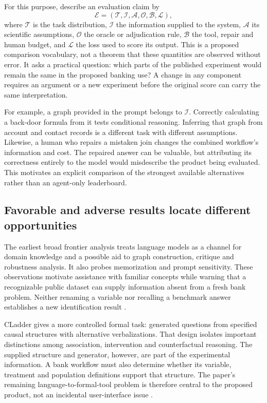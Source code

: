 For this purpose, describe an evaluation claim by
\begin{equation}
 \mathcal E=(\mathcal T,\mathcal I,\mathcal A,\mathcal O,\mathcal B,\mathcal L),
 \label{exec13:frontier-claim}
\end{equation}
where $\mathcal T$ is the task distribution, $\mathcal I$ the information
supplied to the system, $\mathcal A$ its scientific assumptions, $\mathcal O$
the oracle or adjudication rule, $\mathcal B$ the tool, repair and human budget,
and $\mathcal L$ the loss used to score its output. This is a proposed
comparison vocabulary, not a theorem that these quantities are observed without
error. It asks a practical question: which parts of the published experiment
would remain the same in the proposed banking use? A change in any component
requires an argument or a new experiment before the original score can carry
the same interpretation.

For example, a graph provided in the prompt belongs to $\mathcal I$. Correctly
calculating a back-door formula from it tests conditional reasoning. Inferring
that graph from account and contact records is a different task with different
assumptions. Likewise, a human who repairs a mistaken join changes the combined
workflow's information and cost. The repaired answer can be valuable, but
attributing its correctness entirely to the model would misdescribe the product
being evaluated. This motivates an explicit comparison of the strongest
available alternatives rather than an agent-only leaderboard.

\subsection{Favorable and adverse results locate different opportunities}

The earliest broad frontier analysis treats language models as a channel for
domain knowledge and a possible aid to graph construction, critique and
robustness analysis. It also probes memorization and prompt sensitivity. These
observations motivate assistance with familiar concepts while warning that a
recognizable public dataset can supply information absent from a fresh bank
problem. Neither renaming a variable nor recalling a benchmark answer
establishes a new identification result \citep{v12_la_2305_00050}.

CLadder gives a more controlled formal task: generated questions from specified
causal structures with alternative verbalizations. That design isolates
important distinctions among association, intervention and counterfactual
reasoning. The supplied structure and generator, however, are part of the
experimental information. A bank workflow must also determine whether its
variable, treatment and population definitions support that structure. The
paper's remaining language-to-formal-tool problem is therefore central to the
proposed product, not an incidental user-interface issue
\citep{v12_la_2312_04350}.

